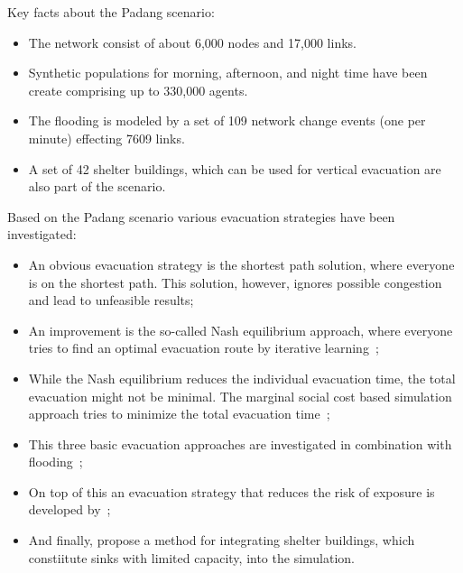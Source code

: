 Key facts about the Padang scenario:
\begin{itemize}
\item The network consist of about 6,000 nodes and 17,000 links.
\item Synthetic populations for morning, afternoon, and night time have been create comprising up to 330,000 agents.
\item The flooding is modeled by a set of 109 network change events (one per minute) effecting 7609 links.
\item A set of 42 shelter buildings, which can be used for vertical evacuation are also part of the scenario.
\end{itemize}
Based on the Padang scenario various evacuation strategies have been investigated:
\begin{itemize}
\item An obvious evacuation strategy is the shortest path solution, where everyone is on the shortest path. This solution, however, ignores possible congestion and lead to unfeasible results;
\item  An improvement is the so-called Nash equilibrium approach, where everyone tries to find an optimal evacuation route by iterative learning~\citep{LaemmelKluepfelNagel2009EvacPadangAtBookTimmermanns};
\item While the Nash equilibrium reduces the individual evacuation time, the total evacuation might not be minimal. The marginal social cost based simulation approach tries to minimize the total evacuation time~\citep{LaemmelFloetteroed_MertschingEtAl_2009,DresslerFloetteroedLaemmelNagelSkutella2010OptimalEvacuationLargeScaleScenarios};
\item This three basic evacuation approaches are investigated in combination with flooding~\citep{LaemmelEtAl_TransResC_2010};
\item On top of this an evacuation strategy that reduces the risk of exposure is developed by~\citep{LaemmelKluepfelNagel2010PEDRiskPrinted};
\item And finally, \citet{FloetteroedLaemmel2010ICECShelterEvac} propose a method for integrating shelter buildings, which constiitute sinks with limited capacity, into the simulation.  
\end{itemize}

